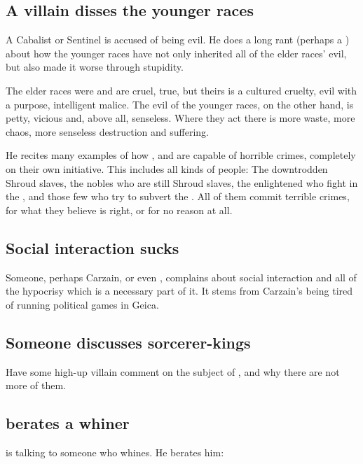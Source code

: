 \subsection{A villain disses the younger races}
A Cabalist or Sentinel is accused of being evil. He does a long rant (perhaps a ) about how the younger races have not only inherited all of the elder races' evil, but also made it worse through stupidity. 

The elder races were and are cruel, true, but theirs is a cultured cruelty, evil with a purpose, intelligent malice. The evil of the younger races, on the other hand, is petty, vicious and, above all, senseless. Where they act there is more waste, more chaos, more senseless destruction and suffering. 

He recites many examples of how \humans{}, \scathae{} and \meccara{} are capable of horrible crimes, completely on their own initiative. This includes all kinds of people: The downtrodden Shroud slaves, the nobles who are still Shroud slaves, the enlightened who fight in the \secretwar, and those few who try to subvert the \secretwar. All of them commit terrible crimes, for what they believe is right, or for no reason at all.







\subsection{Social interaction sucks}
Someone, perhaps Carzain, or even \Ishnaruchaefir, complains about social interaction and all of the hypocrisy which is a necessary part of it. It stems from Carzain's being tired of running political games in Geica.







\subsection{Someone discusses sorcerer-kings}
Have some high-up villain comment on the subject of , and why there are not more of them. 







\subsection{\Ishnaruchaefir{} berates a whiner}
\Ishnaruchaefir{} is talking to someone who whines. He berates him: 






